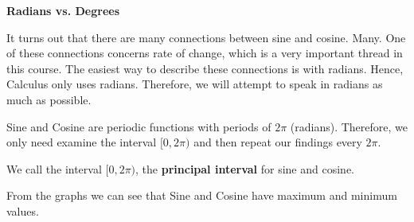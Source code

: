\documentclass{ximera}
\begin{document}
\begin{warning} \textbf{\textcolor{red!70!black}{Radians vs. Degrees}}

It turns out that there are many connections between sine and cosine. Many. One of these connections concerns rate of change, which is a very important thread in this course.  The easiest way to describe these connections is with radians. Hence, Calculus only uses radians. Therefore, we will attempt to speak in radians as much as possible.
\end{warning}








Sine and Cosine are periodic functions with periods of $2\pi$ (radians). Therefore, we only need examine the interval $[0, 2\pi)$ and then repeat our findings every $2\pi$. 


We call the interval $[0, 2\pi)$, the \textbf{principal interval} for sine and cosine. 

From the graphs we can see that Sine and Cosine have maximum and minimum values.
\end{document}
